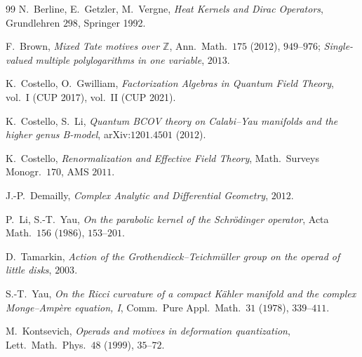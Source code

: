 \documentclass[11pt]{amsart}
\providecommand{\Z}{\mathbb{Z}}
\theoremstyle{definition}
\theoremstyle{remark}
\begin{document}

\begin{thebibliography}{99}
N.~Berline, E.~Getzler, M.~Vergne,
\emph{Heat Kernels and Dirac Operators}, Grundlehren $298$, Springer 1992.

F.~Brown, \emph{Mixed Tate motives over $\Z$}, Ann.\ Math.\ $175$
(2012), $949$--$976$; \emph{Single-valued multiple polylogarithms in
one variable}, $2013$.

K.~Costello, O.~Gwilliam,
\emph{Factorization Algebras in Quantum Field Theory}, vol.\ I (CUP 2017),
vol.\ II (CUP 2021).

K.~Costello, S.~Li,
\emph{Quantum BCOV theory on Calabi--Yau manifolds and the higher
genus B-model}, arXiv:$1201.4501$ ($2012$).

K.~Costello, \emph{Renormalization and Effective Field Theory},
Math.\ Surveys Monogr.\ $170$, AMS $2011$.

J.-P.~Demailly, \emph{Complex Analytic and Differential Geometry},
$2012$.

P.~Li, S.-T.~Yau, \emph{On the parabolic kernel of the Schr\"odinger
operator}, Acta Math.\ $156$ ($1986$), $153$--$201$.

D.~Tamarkin, \emph{Action of the Grothendieck--Teichm\"uller group on the
operad of little disks}, $2003$.

S.-T.~Yau, \emph{On the Ricci curvature of a compact K\"ahler manifold
and the complex Monge--Amp\`ere equation, I}, Comm.\ Pure Appl.\ Math.\
$31$ ($1978$), $339$--$411$.

M.~Kontsevich, \emph{Operads and motives in deformation quantization},
Lett.\ Math.\ Phys.\ $48$ ($1999$), $35$--$72$.
\end{thebibliography}
\end{document}
